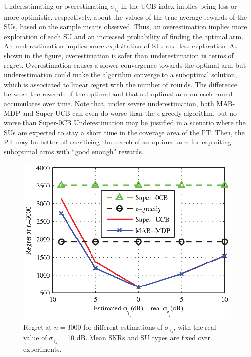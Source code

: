 Underestimating or overestimating $\sigma_{\gamma_s}$ in the UCB index implies being less or more optimistic, respectively, about the values of the true average rewards of the SUs, based on the sample means observed. 
Thus, an overestimation implies more exploration of each SU and an increased probability of finding the optimal arm.
An underestimation implies more exploitation of SUs and less exploration. 
As shown in the figure, overestimation is safer than underestimation in terms of regret.
Overestimation causes a slower convergence towards the optimal arm but underestimation could make the algorithm converge to a suboptimal solution, which is associated to linear regret with the number of rounds. The difference between the rewards of the optimal and that suboptimal arm on each round accumulates over time.  
Note that, under severe underestimation, both MAB-MDP and Super-UCB can even do worse than the $\epsilon$-greedy algorithm, but no worse than Super-0CB
Underestimation may be justified in a scenario where the SUs are expected to stay a short time in the coverage area of the PT. 
Then, the PT may be better off sacrificing the search of an optimal arm for exploiting suboptimal arms with ``good enough'' rewards.


\begin{figure}[!t]
\centering
\includegraphics{unknownVar.eps}
\caption{Regret at $n = 3000$ for different estimations of $\sigma_{\gamma_s}$, with the real value of $\sigma_{\gamma_s}$ = 10 dB. Mean SNRs and SU types are fixed over experiments.}
\label{fig:unknownVar}
\end{figure}

